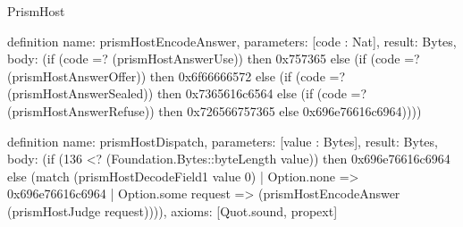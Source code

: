\begin{lexlean}{PrismHost}
\begin{semanticmodule}
definition{
  name: prismHostEncodeAnswer,
  parameters: [code : Nat],
  result: Bytes,
  body: (if (code =? (prismHostAnswerUse)) then 0x757365 else (if (code =? (prismHostAnswerOffer)) then 0x6f66666572 else (if (code =? (prismHostAnswerSealed)) then 0x7365616c6564 else (if (code =? (prismHostAnswerRefuse)) then 0x726566757365 else 0x696e76616c6964))))
}

definition{
  name: prismHostDispatch,
  parameters: [value : Bytes],
  result: Bytes,
  body: (if (136 <? (Foundation.Bytes::byteLength value)) then 0x696e76616c6964 else (match (prismHostDecodeField1 value 0)
    | Option.none => 0x696e76616c6964
    | Option.some request => (prismHostEncodeAnswer (prismHostJudge request)))),
  axioms: [Quot.sound, propext]
}
\end{semanticmodule}
\end{lexlean}
